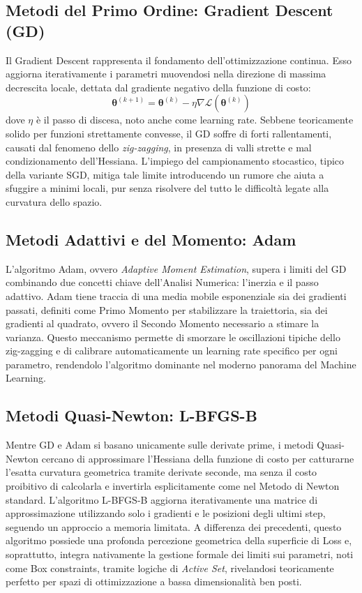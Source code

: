 \documentclass[11pt, a4paper]{article}
\begin{document}
\subsection{Metodi del Primo Ordine: Gradient Descent (GD)}
Il Gradient Descent rappresenta il fondamento dell'ottimizzazione continua. Esso aggiorna iterativamente i parametri muovendosi nella direzione di massima decrescita locale, dettata dal gradiente negativo della funzione di costo:
\begin{equation}
    \boldsymbol{\theta}^{(k+1)} = \boldsymbol{\theta}^{(k)} - \eta \nabla \mathcal{L}(\boldsymbol{\theta}^{(k)})
\end{equation}
dove $\eta$ è il passo di discesa, noto anche come learning rate. Sebbene teoricamente solido per funzioni strettamente convesse, il GD soffre di forti rallentamenti, causati dal fenomeno dello \textit{zig-zagging}, in presenza di valli strette e mal condizionamento dell'Hessiana. L'impiego del campionamento stocastico, tipico della variante SGD, mitiga tale limite introducendo un rumore che aiuta a sfuggire a minimi locali, pur senza risolvere del tutto le difficoltà legate alla curvatura dello spazio.

\subsection{Metodi Adattivi e del Momento: Adam}
L'algoritmo Adam, ovvero \textit{Adaptive Moment Estimation}, supera i limiti del GD combinando due concetti chiave dell'Analisi Numerica: l'inerzia e il passo adattivo. Adam tiene traccia di una media mobile esponenziale sia dei gradienti passati, definiti come Primo Momento per stabilizzare la traiettoria, sia dei gradienti al quadrato, ovvero il Secondo Momento necessario a stimare la varianza.
Questo meccanismo permette di smorzare le oscillazioni tipiche dello zig-zagging e di calibrare automaticamente un learning rate specifico per ogni parametro, rendendolo l'algoritmo dominante nel moderno panorama del Machine Learning.

\subsection{Metodi Quasi-Newton: L-BFGS-B}
Mentre GD e Adam si basano unicamente sulle derivate prime, i metodi Quasi-Newton cercano di approssimare l'Hessiana della funzione di costo per catturarne l'esatta curvatura geometrica tramite derivate seconde, ma senza il costo proibitivo di calcolarla e invertirla esplicitamente come nel Metodo di Newton standard.
L'algoritmo L-BFGS-B aggiorna iterativamente una matrice di approssimazione utilizzando solo i gradienti e le posizioni degli ultimi step, seguendo un approccio a memoria limitata. A differenza dei precedenti, questo algoritmo possiede una profonda percezione geometrica della superficie di Loss e, soprattutto, integra nativamente la gestione formale dei limiti sui parametri, noti come Box constraints, tramite logiche di \textit{Active Set}, rivelandosi teoricamente perfetto per spazi di ottimizzazione a bassa dimensionalità ben posti.
\end{document}
